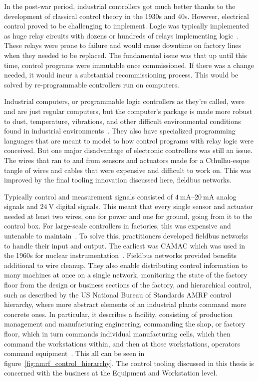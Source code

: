 \documentclass[english,12pt,a4paper,pdftex,eng,utf8]{aaltothesis}
\begin{document}
In the post-war period, industrial controllers got much better thanks to the development of classical control theory in the 1930s and 40s.  However, electrical control proved to be challenging to implement.  Logic was typically implemented as huge relay circuits with dozens or hundreds of relays implementing logic~\cite{Parr1993}.  These relays were prone to failure and would cause downtime on factory lines when they needed to be replaced.  The fundamental issue was that up until this time, control programs were immutable once commissioned.  If there was a change needed, it would incur a substantial recommissioning process.  This would be solved by re-programmable controllers run on computers.

Industrial computers, or programmable logic controllers as they're called, were and are just regular computers, but the computer's package is made more robust to dust, temperature, vibrations, and other difficult environmental conditions found in industrial environments~\cite{Parr1993}.  They also have specialized programming languages that are meant to model to how control programs with relay logic were conceived.  But one major disadvantage of electronic controllers was still an issue.  The wires that ran to and from sensors and actuators made for a Cthulhu-esque tangle of wires and cables that were expensive and difficult to work on.  This was improved by the final tooling innovation discussed here, fieldbus networks.

Typically control and measurement signals consisted of $\qtyrange[range-units=single,range-phrase=..]{4}{20}{\milli\ampere}$ analog signals and $\qty{24}{\volt}$ digital signals.  This meant that every single sensor and actuator needed at least two wires, one for power and one for ground, going from it to the control box.  For large-scale controllers in factories, this was expensive and untenable to maintain~\cite{Thomesse2005}.  To solve this, practitioners developed fieldbus networks to handle their input and output.  The earliest was CAMAC which was used in the 1960s for nuclear instrumentation~\cite{Thomesse2005}.  Fieldbus networks provided benefits additional to wire cleanup.  They also enable distributing control information to many machines at once on a single network, monitoring the state of the factory floor from the design or business sections of the factory, and hierarchical control, such as described by the US National Bureau of Standards AMRF control hierarchy, where more abstract elements of an industrial plants command more concrete ones.  In particular, it describes a facility, consisting of production management and manufacturing engineering, commanding the shop, or factory floor, which in turn commands individual manufacturing cells, which then command the workstations within, and then at those workstations, operators command equipment~\cite{McLean1987}.  This all can be seen in figure~\ref{fig:amrf_control_hierarchy}.  The control tooling discussed in this thesis is concerned with the business at the Equipment and Workstation level.
\end{document}
